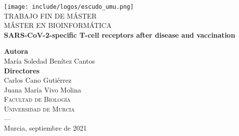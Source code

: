 \begin{titlepage}


\newlength{\centeroffset}
\setlength{\centeroffset}{-0.5\oddsidemargin}
\addtolength{\centeroffset}{0.5\evensidemargin}
\thispagestyle{empty}

\noindent\hspace*{\centeroffset}\begin{minipage}{\textwidth}

\centering
\texttt{[image: include/logos/escudo\_umu.png]}\\[1.4cm]

\textsc{ \Large TRABAJO FIN DE MÁSTER\\[0.2cm]}
\textsc{ MÁSTER EN BIOINFORMÁTICA}\\[1cm]
%
{\Huge\bfseries SARS-CoV-2-specific T-cell receptors after disease and vaccination\\
}
\end{minipage}

\vspace{2.5cm}
\noindent\hspace*{\centeroffset}\begin{minipage}{\textwidth}
\centering

\textbf{Autora}\\ {María Soledad Benítez Cantos}\\[2.5ex]
\textbf{Directores}\\
{Carlos Cano Gutiérrez\\
Juana María Vivo Molina}\\[2cm]
\textsc{Facultad de Biología}\\
\textsc{Universidad de Murcia}\\
\textsc{---}\\
Murcia, septiembre de 2021
\end{minipage}
\end{titlepage}
